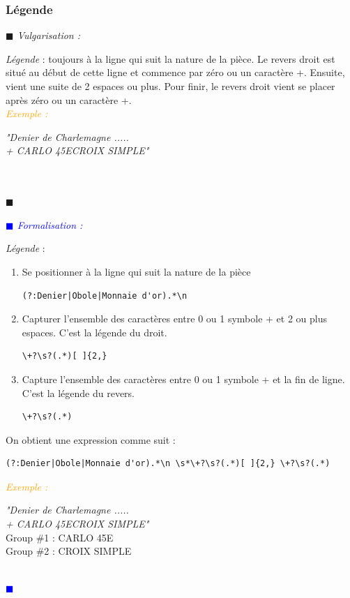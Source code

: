\documentclass[a4paper, 11pt]{book}
\newenvironment{vulgarisation}
    {
    \textit{\textcolor{dark-blue}{$\blacksquare$  Vulgarisation : \\}}

    }
    {
    ~\\\textcolor{dark-blue}{$\blacksquare$}\\
    }
\newenvironment{formalisation}
    {
    \textit{\textcolor{blue}{$\blacksquare$  Formalisation : \\}}
    }
    {
    ~\\\textcolor{blue}{$\blacksquare$}\\
    }
\newenvironment{exemple}
    {
    \textit{\textcolor{orange}{
    Exemple : \\}}
    }
    {\\
    }
\begin{document}
\subsubsection{Légende}
\begin{vulgarisation}
	\textit{Légende} : toujours à la ligne qui suit la nature de la pièce. Le revers droit est situé au début de cette ligne et commence par zéro ou un caractère +. Ensuite, vient une suite de 2 espaces ou plus. Pour finir, le revers droit vient se placer après zéro ou un caractère +.\\
	\begin{exemple}
		\emph{"Denier de Charlemagne ..... \\+ CARLO  45E\indent\indent CROIX SIMPLE"}\\
	\end{exemple}
\end{vulgarisation}

\begin{formalisation}
	\textit{Légende} :
	\begin{enumerate}
		\item Se positionner à la ligne qui suit la nature de la pièce
		      \begin{verbatim}
(?:Denier|Obole|Monnaie d'or).*\n
		\end{verbatim}
		\item Capturer l'ensemble des caractères entre 0 ou 1 symbole + et 2 ou plus espaces. C'est la légende du droit.
		      \begin{verbatim}
\+?\s?(.*)[ ]{2,}
		\end{verbatim}
		\item Capture l'ensemble des caractères entre 0 ou 1 symbole + et la fin de ligne. C'est la légende du revers.
		      \begin{verbatim}
\+?\s?(.*)
		\end{verbatim}
	\end{enumerate}
	
	On obtient une expression comme suit : 
	\begin{verbatim}
(?:Denier|Obole|Monnaie d'or).*\n \s*\+?\s?(.*)[ ]{2,} \+?\s?(.*)
	\end{verbatim}
	
	\begin{exemple}
		\emph{"Denier de Charlemagne ..... \\+ CARLO  45E\indent\indent CROIX SIMPLE"}\\
		Group \#1 : CARLO  45E \\
		Group \#2 : CROIX SIMPLE
	\end{exemple}
\end{formalisation}
\end{document}
